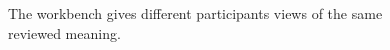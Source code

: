 \begin{figure}[H]
\centering
{}
\caption{The workbench gives different participants views of the same reviewed meaning.}\label{fig:teach-P-03-product-00}
\end{figure}
